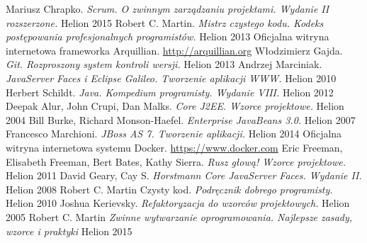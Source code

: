 \begin{thebibliography}{99}
	 Mariusz Chrapko. \emph{Scrum. O zwinnym zarządzaniu projektami. Wydanie II rozszerzone.} Helion 2015
	 Robert C. Martin. \emph{Mistrz czystego kodu. Kodeks postępowania profesjonalnych programistów.} Helion 2013
	 Oficjalna witryna internetowa frameworka Arquillian. \url{http://arquillian.org}
	 Włodzimierz Gajda. \emph{Git. Rozproszony system kontroli wersji.} Helion 2013	
	 Andrzej Marciniak. \emph{JavaServer Faces i Eclipse Galileo. Tworzenie aplikacji WWW.} Helion 2010
	 Herbert Schildt. \emph{Java. Kompedium programisty. Wydanie VIII.} Helion 2012
	 Deepak Alur, John Crupi, Dan Malks. \emph{Core J2EE. Wzorce projektowe.} Helion 2004
	 Bill Burke, Richard Monson-Haefel. \emph{Enterprise JavaBeans 3.0.} Helion 2007
	 Francesco Marchioni. \emph{JBoss AS 7. Tworzenie aplikacji.} Helion 2014
	 Oficjalna witryna internetowa systemu Docker. \url{https://www.docker.com}
	 Eric Freeman, Elisabeth Freeman, Bert Bates, Kathy Sierra. \emph{Rusz głową! Wzorce projektowe.} Helion 2011
	 David Geary, Cay S. \emph{Horstmann Core JavaServer Faces. Wydanie II.} Helion 2008
	 Robert C. Martin Czysty kod. \emph{Podręcznik dobrego programisty.} Helion 2010
	 Joshua Kerievsky. \emph{Refaktoryzacja do wzorców projektowych.} Helion 2005
	 Robert C. Martin \emph{Zwinne wytwarzanie oprogramowania. Najlepsze zasady, wzorce i praktyki} Helion 2015		
\end{thebibliography}